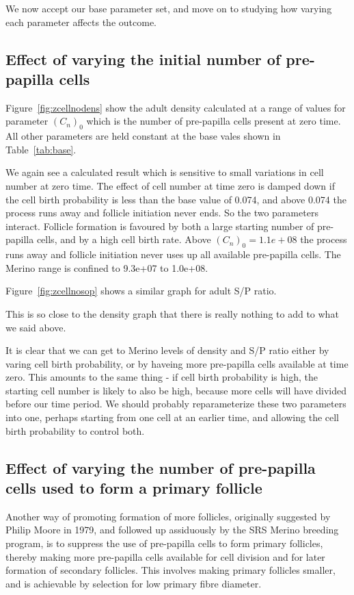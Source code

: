 \documentclass[titlepage]{article}  %
\begin{document}
We now accept our base parameter set, and move on to studying how varying each parameter affects the outcome.

\subsection{Effect of varying the initial number of pre-papilla cells}
Figure~\ref{fig:zcellnodens} show the adult density calculated at a range of values for parameter $(C_{n})_{0}$ which is the number of pre-papilla cells present at zero time. All other parameters are held constant at the base vales shown in Table~\ref{tab:base}.

We again see a calculated result which is sensitive to small variations in cell number at zero time. The effect of cell number at time zero is damped down if the cell birth probability is less than the base value of 0.074, and above 0.074 the process runs away and follicle initiation never ends. So the two parameters interact. Follicle formation is favoured by both a large starting number of pre-papilla cells, and by a high cell birth rate. Above $(C_{n})_{0}=1.1e+08$ the process runs away and follicle initiation never uses up all available pre-papilla cells. The Merino range is confined to 9.3e+07 to 1.0e+08.

Figure~\ref{fig:zcellnosop} shows a similar graph for adult S/P ratio. 

This is so close to the density graph that there is really nothing to add to what we said above.

It is clear that we can get to Merino levels of density and S/P ratio either by varing cell birth probability, or by haveing more pre-papilla cells available at time zero. This amounts to the same thing - if cell birth probability is high, the starting cell number is likely to also be high, because more cells will have divided before our time period.  We should probably reparameterize these two parameters into one, perhaps starting from one cell at an earlier time, and allowing the cell birth probability to control both. 

\subsection{Effect of varying the number of pre-papilla cells used to form a primary follicle}
Another way of promoting formation of more follicles, originally suggested by Philip Moore in 1979, and followed up assiduously by the SRS Merino breeding program, is to suppress the use of pre-papilla cells to form primary follicles, thereby making more pre-papilla cells available for cell division and for later formation of secondary follicles. This involves making primary follicles smaller, and is achievable by selection for low primary fibre diameter. 
\end{document}
